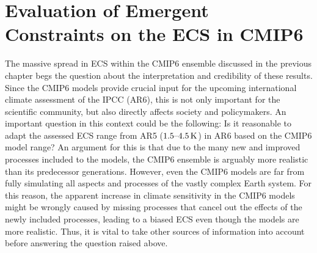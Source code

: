 


\chapter{Evaluation of Emergent Constraints on the \acl{ECS} in \acs{CMIP}6}
\label{ch:05:paper_ecs}

The massive spread in \ac{ECS} within the \acs{CMIP}6 ensemble discussed in the
previous chapter begs the question about the interpretation and credibility of
these results. Since the \acs{CMIP}6 models provide crucial input for the
upcoming international climate assessment of the \ac{IPCC} (\acs{AR}6), this is
not only important for the scientific community, but also directly affects
society and policymakers. An important question in this context could be the
following: Is it reasonable to adapt the assessed \ac{ECS} range from \acs{AR}5
($\range{1.5}{4.5} \unit{K}$) in \acs{AR}6 based on the \acs{CMIP}6 model
range? An argument for this is that due to the many new and improved processes
included to the models, the \acs{CMIP}6 ensemble is arguably more realistic
than its predecessor generations. However, even the \acs{CMIP}6 models are far
from fully simulating all aspects and processes of the vastly complex Earth
system. For this reason, the apparent increase in climate sensitivity in the
\acs{CMIP}6 models might be wrongly caused by missing processes that cancel out
the effects of the newly included processes, leading to a biased \ac{ECS} even
though the models are more realistic. Thus, it is vital to take other sources
of information into account before answering the question raised above.

